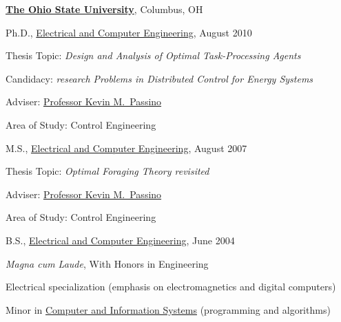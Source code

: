 \documentclass{article}
\begin{document}
\href{http://www.osu.edu/}{\textbf{The Ohio State University}},
Columbus, OH
\begin{outerlist}

\item[] Ph.D.,
        \href{http://www.ece.osu.edu/}
             {Electrical and Computer Engineering},
             August 2010
        \begin{innerlist}
        \item Thesis Topic: \emph{Design and Analysis of Optimal
            Task-Processing Agents}
        \item Candidacy: \emph{research
            Problems in Distributed Control for Energy Systems}
        \item Adviser:
              \href{http://www.ece.osu.edu/~passino/}
                   {Professor Kevin M.~Passino}
        \item Area of Study: Control Engineering
        \end{innerlist}

\item[] M.S.,
        \href{http://www.ece.osu.edu/}
             {Electrical and Computer Engineering}, August 2007
        \begin{innerlist}
        \item Thesis Topic: \emph{Optimal Foraging Theory revisited}
        \item Adviser:
              \href{http://www.ece.osu.edu/~passino/}
                   {Professor Kevin M.~Passino}
        \item Area of Study: Control Engineering
        \end{innerlist}

\item[] B.S.,
        \href{http://www.ece.osu.edu/}
             {Electrical and Computer Engineering}, June 2004
        \begin{innerlist}
        \item \emph{Magna cum Laude}, With Honors in Engineering
        \item Electrical specialization (emphasis on electromagnetics and digital computers)
        \item Minor in \href{http://www.cse.ohio-state.edu/}
                            {Computer and Information Systems}
              (programming and algorithms)
        \end{innerlist}

\end{outerlist}
\end{document}
